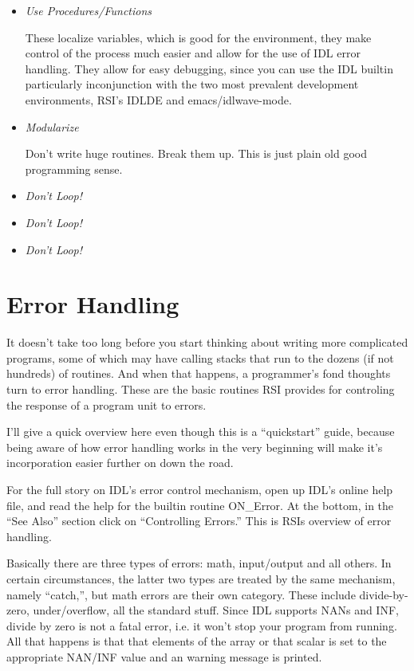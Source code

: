 \begin{itemize}
  \item \textit{Use Procedures/Functions}

        These localize variables, which is good for the environment,
  they make control of the process much easier and allow for the use
  of IDL error handling. They allow for easy debugging, since you can
   use the IDL builtin  particularly inconjunction
   with the two most prevalent development environments, RSI's IDLDE
   and emacs/idlwave-mode.

  \item \textit{Modularize}

   Don't write huge routines. Break them up. This is just plain old
   good programming sense.

  \item \textit{Don't Loop!}
  \item \textit{Don't Loop!}
  \item \textit{Don't Loop!}


\end{itemize}

\section{Error Handling}\label{sec:qs-error-handling}
  
  It doesn't take too long before you start thinking about writing
  more complicated programs, some of which may have calling stacks
  that run to the dozens (if not hundreds) of routines. And when that
  happens, a programmer's fond thoughts turn to error handling. These
  are the basic routines RSI provides for controling the response of a
  program unit to errors.

  I'll give a quick overview here even though this is a ``quickstart''
  guide, because being aware of how error handling works in the very
  beginning will make it's incorporation easier further on down the
  road.

  For the full story on IDL's error control mechanism, open up IDL's
  online help file, and read the help for the builtin routine
  ON\_Error. At the bottom, in the ``See Also'' section click on
  ``Controlling Errors.'' This is RSIs  overview of error handling. 

  Basically there are three types of errors: math, input/output and
  all others. In certain circumstances, the latter two types are
  treated by the same mechanism, namely ``catch,'', but math errors
  are their own category. These include divide-by-zero,
  under/overflow, all the standard stuff. Since IDL supports NANs and
  INF, divide by zero is not a fatal error, i.e. it won't stop your
  program from running. All that happens is that that elements of the
  array or that scalar is set to the appropriate NAN/INF value and an
  warning message is printed. 


